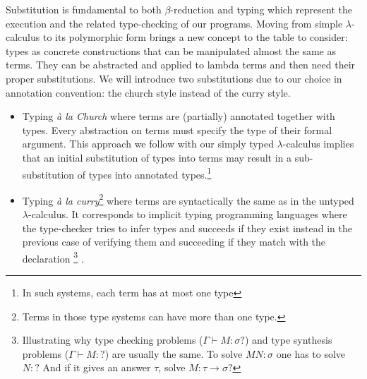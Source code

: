 \documentclass{article}
\begin{document}
    Substitution is fundamental to both $\beta$-reduction and typing which represent the execution and the related type-checking of our programs. Moving from simple $\lambda$-calculus to its polymorphic form brings a new concept to the table to consider: types as concrete constructions that can be manipulated almost the same as terms. They can be abstracted and applied to lambda terms and then need their proper substitutions. We will introduce two substitutions due to our choice in annotation convention: the church style instead of the curry style.
    \begin{itemize}
        \item Typing \textit{à la Church} where terms are (partially) annotated together with types. Every abstraction on terms must specify the type of their formal argument. This approach we follow with our simply typed $\lambda$-calculus implies that an initial substitution of types into terms may result in a sub-substitution of types into annotated types.\footnote{In such systems, each term has at most one type}

        \item Typing \textit{à la curry}\footnote{Terms in those type systems can have more than one type.} where terms are syntactically the same as in the untyped $\lambda$-calculus. It corresponds to implicit typing programming languages where the type-checker tries to infer types and succeeds if they exist instead in the previous case of verifying them and succeeding if they match with the declaration
        \footnote{Illustrating why type checking problems ($\Gamma\vdash M : \sigma ?$) and type synthesis problems ($\Gamma\vdash M :  ?$) are usually the same. To solve $M N : \sigma$ one has to solve $N : ?$ And if it gives an answer $\tau$, solve $M:\tau\rightarrow\sigma ?$}
        .
    \end{itemize}
\end{document}
